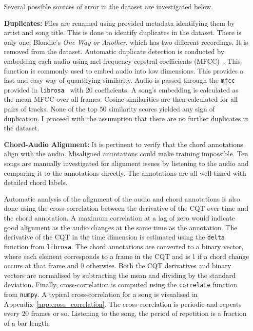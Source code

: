 Several possible sources of error in the dataset are investigated below.

\textbf{Duplicates:} Files are renamed using provided metadata identifying them by artist and song title. This is done to identify duplicates in the dataset. There is only one: Blondie's \emph{One Way or Another}, which has two different recordings. It is removed from the dataset. Automatic duplicate detection is conducted by embedding each audio using mel-frequency cepstral coefficients (MFCC)~\citep{MFCC}. This function is commonly used to embed audio into low dimensions. This provides a fast and easy way of quantifying similarity. Audio is passed through the \texttt{mfcc} provided in \texttt{librosa}~\citep{librosa} with 20 coefficients. A song's embedding is calculated as the mean MFCC over all frames. Cosine similarities are then calculated for all pairs of tracks. None of the top 50 similarity scores yielded any sign of duplication. I proceed with the assumption that there are no further duplicates in the dataset.

\textbf{Chord-Audio Alignment:} It is pertinent to verify that the chord annotations align with the audio. Misaligned annotations could make training impossible. Ten songs are manually investigated for alignment issues by listening to the audio and comparing it to the annotations directly. The annotations are all well-timed with detailed chord labels.

Automatic analysis of the alignment of the audio and chord annotations is also done using the cross-correlation between the derivative of the CQT over time and the chord annotation. A maximum correlation at a lag of zero would indicate good alignment as the audio changes at the same time as the annotation. The derivative of the CQT in the time dimension is estimated using the \texttt{delta} function from \texttt{librosa}. The chord annotations are converted to a binary vector, where each element corresponds to a frame in the CQT and is 1 if a chord change occurs at that frame and 0 otherwise. Both the CQT derivatives and binary vectors are normalised by subtracting the mean and dividing by the standard deviation. Finally, cross-correlation is computed using the \texttt{correlate} function from \texttt{numpy}. A typical cross-correlation for a song is visualised in Appendix~\ref{app:cross_correlation}. The cross-correlation is periodic and repeats every 20 frames or so. Listening to the song, the period of repetition is a fraction of a bar length. 

